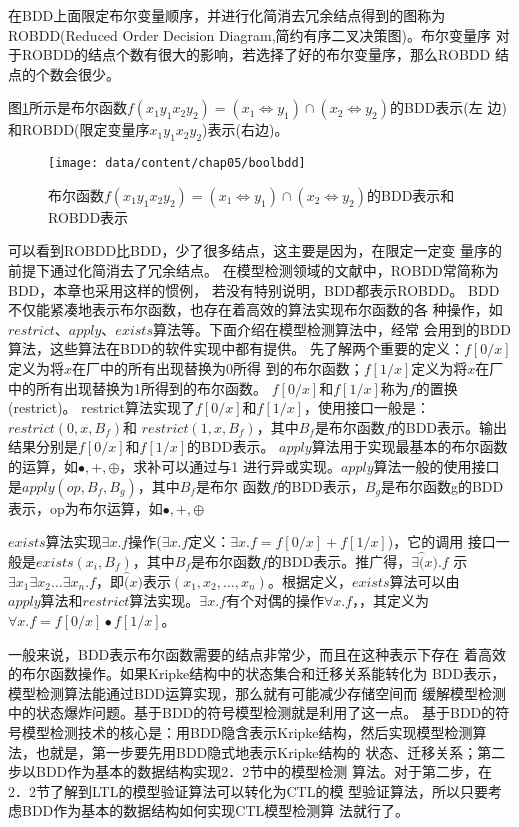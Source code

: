 在BDD上面限定布尔变量顺序，并进行化简消去冗余结点得到的图称为
ROBDD(Reduced Order Decision Diagram,简约有序二叉决策图)。布尔变量序
对于ROBDD的结点个数有很大的影响，若选择了好的布尔变量序，那么ROBDD
结点的个数会很少。

图\ref{fig-boolbdd}所示是布尔函数$f(x_1 y_1 x_2 y_2)=(x_1\Leftrightarrow y_1)\cap(x_2\Leftrightarrow y_2)$的BDD表示(左
边)和ROBDD(限定变量序$x_1 y_1 x_2 y_2$)表示(右边)。

\begin{figure}[htp]
	\centering
	\texttt{[image: data/content/chap05/boolbdd]}
	\caption{布尔函数$f(x_1 y_1 x_2 y_2)=(x_1\Leftrightarrow y_1)\cap(x_2\Leftrightarrow y_2)$的BDD表示和ROBDD表示}
	\label{fig-boolbdd}
\end{figure}

可以看到ROBDD比BDD，少了很多结点，这主要是因为，在限定一定变
量序的前提下通过化简消去了冗余结点。
在模型检测领域的文献中，ROBDD常简称为BDD，本章也采用这样的惯例，
若没有特别说明，BDD都表示ROBDD。
BDD不仅能紧凑地表示布尔函数，也存在着高效的算法实现布尔函数的各
种操作，如$restrict、apply、exists$算法等。下面介绍在模型检测算法中，经常
会用到的BDD算法，这些算法在BDD的软件实现中都有提供。
先了解两个重要的定义：$f[0/x]$定义为将$x$在厂中的所有出现替换为0所得
到的布尔函数；$f[1/x]$定义为将$x$在厂中的所有出现替换为1所得到的布尔函数。
$f[0/x]$和$f[1/x]$称为$f$的置换(restrict)。
restrict算法实现了$f[0/x]$和$f[1/x]$，使用接口一般是：$restrict(0,x,B_f)$和
$restrict(1,x,B_f)$，其中$B_f$是布尔函数$f$的BDD表示。输出结果分别是$f[0/x]$和$f[1/x]$的BDD表示。
$apply$算法用于实现最基本的布尔函数的运算，如$\bullet,+,\oplus$，求补可以通过与1
进行异或实现。$apply$算法一般的使用接口是$apply(op,B_f,B_g)$，其中$B_f$是布尔
函数$f$的BDD表示，$B_g$是布尔函数g的BDD表示，op为布尔运算，如$\bullet,+,\oplus$

$exists$算法实现$\exists x.f$操作($\exists x.f$定义：$\exists x.f=f[0/x]+f[1/x]$)，它的调用
接口一般是$exists(x_i,B_f)$，其中$B_f$是布尔函数$f$的BDD表示。推广得，$\exists \hat(x).f$
示$\exists x_1\exists x_2\ldots\exists x_n.f$，即$\hat(x)$表示$(x_1,x_2,\ldots,x_n)$。根据定义，$exists$算法可以由$apply
算法和restrict$算法实现。$\exists x.f$有个对偶的操作$\forall x.f$，，其定义为
$\forall x.f=f[0/x]\bullet f[1/x]$。

一般来说，BDD表示布尔函数需要的结点非常少，而且在这种表示下存在
着高效的布尔函数操作。如果Kripke结构中的状态集合和迁移关系能转化为
BDD表示，模型检测算法能通过BDD运算实现，那么就有可能减少存储空间而
缓解模型检测中的状态爆炸问题。基于BDD的符号模型检测就是利用了这一点。
基于BDD的符号模型检测技术的核心是：用BDD隐含表示Kripke结构，然后实现模型检测算法，也就是，第一步要先用BDD隐式地表示Kripke结构的
状态、迁移关系；第二步以BDD作为基本的数据结构实现2．2节中的模型检测
算法。对于第二步，在2．2节了解到LTL的模型验证算法可以转化为CTL的模
型验证算法，所以只要考虑BDD作为基本的数据结构如何实现CTL模型检测算
法就行了。

